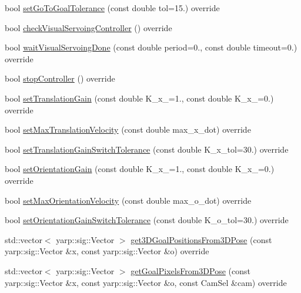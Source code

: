 \begin{DoxyCompactItemize}
\item 
bool \hyperlink{classVisualServoingServer_ad632db85663df2f8c7ca5c27eaacfd71}{set\+Go\+To\+Goal\+Tolerance} (const double tol=15.) override
\item 
bool \hyperlink{classVisualServoingServer_afa417f05dd02d2e91ff2c848f082a33b}{check\+Visual\+Servoing\+Controller} () override
\item 
bool \hyperlink{classVisualServoingServer_a3b462062db0cdcf3c8777469376bb5b6}{wait\+Visual\+Servoing\+Done} (const double period=0., const double timeout=0.) override
\item 
bool \hyperlink{classVisualServoingServer_a4a21e5698a1d3b8db7c82772252bd215}{stop\+Controller} () override
\item 
bool \hyperlink{classVisualServoingServer_ab995d07572eb6e1103c73cc190c00e4a}{set\+Translation\+Gain} (const double K\+\_\+x\+\_=1., const double K\+\_\+x\+\_=0.) override
\item 
bool \hyperlink{classVisualServoingServer_aa9b4b1b69b8600d7eac62a66af483bdb}{set\+Max\+Translation\+Velocity} (const double max\+\_\+x\+\_\+dot) override
\item 
bool \hyperlink{classVisualServoingServer_a5274182a8ff476c6b734ddf7cc78bef2}{set\+Translation\+Gain\+Switch\+Tolerance} (const double K\+\_\+x\+\_\+tol=30.) override
\item 
bool \hyperlink{classVisualServoingServer_afb7ac6f85a55f928aa75134ba0ad1d79}{set\+Orientation\+Gain} (const double K\+\_\+x\+\_=1., const double K\+\_\+x\+\_=0.) override
\item 
bool \hyperlink{classVisualServoingServer_a9f93de2ddb7818555bebad9ad0705029}{set\+Max\+Orientation\+Velocity} (const double max\+\_\+o\+\_\+dot) override
\item 
bool \hyperlink{classVisualServoingServer_a5a32f1ee99bff8b8a34d3825c30ffffc}{set\+Orientation\+Gain\+Switch\+Tolerance} (const double K\+\_\+o\+\_\+tol=30.) override
\item 
std\+::vector$<$ yarp\+::sig\+::\+Vector $>$ \hyperlink{classVisualServoingServer_acc8932e08714c503ba6cfda11461976e}{get3\+D\+Goal\+Positions\+From3\+D\+Pose} (const yarp\+::sig\+::\+Vector \&x, const yarp\+::sig\+::\+Vector \&o) override
\item 
std\+::vector$<$ yarp\+::sig\+::\+Vector $>$ \hyperlink{classVisualServoingServer_a9d35a09c55cc8c059dc7bdbeeed8cfb1}{get\+Goal\+Pixels\+From3\+D\+Pose} (const yarp\+::sig\+::\+Vector \&x, const yarp\+::sig\+::\+Vector \&o, const Cam\+Sel \&cam) override

\end{DoxyCompactItemize}
